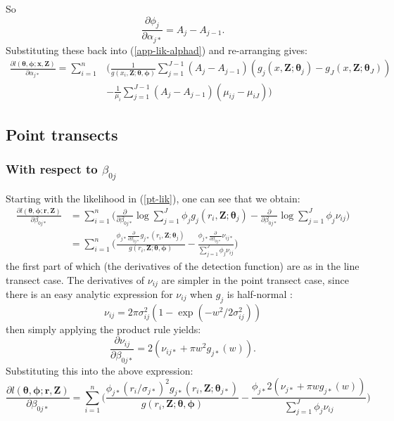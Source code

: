 \documentclass[useAMS,referee, usegraphicx]{biom}
\begin{document}
So
\begin{equation*}
\frac{\partial \phi_j}{\partial \alpha_{j*}} = A_j - A_{j-1}.
\end{equation*}
Substituting these back into (\ref{app-lik-alphad}) and re-arranging gives:
\begin{align*}
\frac{\partial l(\bm{\theta},\bm{\phi}; \mathbf{x},\mathbf{Z})}{\partial \alpha_{j*}} = \sum_{i=1}^n & \Big( \frac{1}{g(x_i,\mathbf{Z}; \bm{\theta},\bm{\phi})} \sum_{j=1}^{J-1} (A_j - A_{j-1}) (g_j(x,\mathbf{Z}; \bm{\theta}_j) - g_J(x,\mathbf{Z}; \bm{\theta}_J))\\
&- \frac{1}{\mu_i} \sum_{j=1}^{J-1}(A_j - A_{j-1})(\mu_{ij} - \mu_{iJ}) \Big)
\end{align*}

\subsection*{Point transects}

\subsubsection*{With respect to $\beta_{0j}$}

Starting with the likelihood in (\ref{pt-lik}), one can see that we obtain:
\begin{align*}
\frac{\partial l(\bm{\theta}, \bm{\phi}; \mathbf{r},\mathbf{Z})}{\partial \beta_{0j*}}  &= \sum_{i=1}^n \Big( \frac{\partial}{\partial \beta_{0j*}} \log \sum_{j=1}^J \phi_j g_j(r_i,\mathbf{Z}; \bm{\theta}_j) - \frac{\partial}{\partial \beta_{0j*}}\log \sum_{j=1}^J \phi_j \nu_{ij}\Big)\\
&= \sum_{i=1}^n \Big( \frac{ \phi_{j*} \frac{\partial}{\partial \beta_{0j*}}  g_{j*} (r_i,\mathbf{Z}; \bm{\theta}_j)}{g(r_i,\mathbf{Z}; \bm{\theta}, \bm{\phi})} - \frac{ \phi_{j*}\frac{\partial}{\partial \beta_{0j*}}  \nu_{ij*} }{ \sum_{j=1}^J \phi_j \nu_{ij}}\Big)
\end{align*}
the first part of which (the derivatives of the detection function) are as in the line transect case. The derivatives of $\nu_{ij}$ are simpler in the point transect case, since there is an easy analytic expression for $\nu_{ij}$ when $g_j$ is half-normal :
\begin{equation*}
\nu_{ij} = 2 \pi \sigma_{ij}^2 (1-\exp (-w^2/2\sigma_{ij}^2 ))
\end{equation*}
then simply applying the product rule yields:
\begin{equation*}
\frac{\partial \nu_{ij}}{\partial \beta_{0j*}} = 2 (\nu_{ij*} + \pi w^2 g_{j*}(w)).
\end{equation*}
Substituting this into the above expression:
\begin{equation*}
\frac{\partial l(\bm{\theta}, \bm{\phi}; \mathbf{r},\mathbf{Z})}{\partial \beta_{0j*}}  = \sum_{i=1}^n \Big( \frac{ \phi_{j*} (r_i/\sigma_{j*})^2 g_{j*}(r_i,\mathbf{Z}; \bm{\theta}_{j*})}{g(r_i,\mathbf{Z}; \bm{\theta}, \bm{\phi})} - \frac{ \phi_{j*} 2 (\nu_{j*} + \pi w g_{j*}(w)) }{ \sum_{j=1}^J \phi_j \nu_{ij}}\Big)
\end{equation*}
\end{document}
